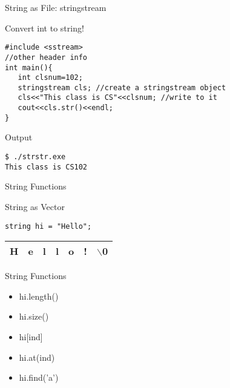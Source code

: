 \documentclass[xcolor={dvipsnames}]{beamer}
\begin{document}
\begin{frame}[fragile]{String as File: stringstream}
\begin{block}{Convert int to string!}
\begin{verbatim}
#include <sstream>
//other header info
int main(){
   int clsnum=102;
   stringstream cls; //create a stringstream object
   cls<<"This class is CS"<<clsnum; //write to it
   cout<<cls.str()<<endl;
}
\end{verbatim}
\end{block}

\begin{block}{Output}
\begin{verbatim}
$ ./strstr.exe
This class is CS102
\end{verbatim}
\end{block}
\end{frame}

\begin{frame}[fragile]{String Functions}
\begin{block}{String as Vector}
\begin{verbatim}
string hi = "Hello";
\end{verbatim}
\begin{table}
	\Huge
	\begin{tabular}{|c|c|c|c|c|c|c|}
	\hline
	H & e & l & l & o & ! & $\backslash$0\\
	\hline
	\end{tabular}
\end{table}
\end{block}
\begin{block}{String Functions}
	\begin{itemize}
		\item hi.length()
		\item hi.size()
		\item hi[ind]
		\item hi.at(ind)
		\item hi.find('a')
	\end{itemize}
\end{block}
\end{frame}
\end{document}
